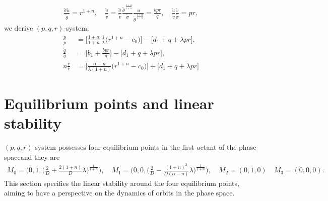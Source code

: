 \documentclass[a4paper,11pt]{article}
\def\tv{{\tilde{v}}}
\def\tth{{\tilde{\theta}}}
\def\ts{{\tilde{\sigma}}}
\def\tu{{\tilde{u}}}
\def\dpp{\dot{p}}
\def\dqq{\dot{q}}
\def\drr{\dot{r}}
\begin{document}
\begin{align*}
 \frac{\ts\tu}{\tth} = r^{1+n}, \quad \frac{\tu}{\tv} = \frac{\ts}{\tv} \frac{\tth^{\,\frac{1+\alpha}{1+n}}}{\ts} \frac{u}{\tth^{\,\frac{1+\alpha}{1+n}}} = \frac{bpr}{q}, \quad \frac{\tu}{\tv} \frac{\tv}{\ts} = pr,
\end{align*}
we derive $(p,q,r)$-system:
\begin{equation} \label{eq:pqrsys}
\begin{aligned}
 \frac{\dpp}{p}&=\Big[\frac{1+\alpha}{1+n}\,\frac{1}{\lambda }\Big(r^{1+n}-c_0\Big)\Big] -\Big[d_1 + q + \lambda pr\Big],\\
 \frac{\dqq}{q}&=\Big[b_1 +\frac{bpr}{q}\Big] -\Big[d_1 + q + \lambda pr\Big],\\
 n\frac{\drr}{r}&=\Big[\frac{\alpha-n}{\lambda(1+n)}\Big(r^{1+n}-c_0\Big)\Big]+\Big[d_1 + q + \lambda pr\Big]
\end{aligned}
\end{equation}
\section{Equilibrium points and linear stability}
$(p,q,r)$-system possesses four equilibrium points in the first octant of the phase space\footnotemark[1] and they are
\begin{align*}
 M_0=\Big(0,1,\big(\frac{2}{D} + \frac{2(1+n)}{D} \lambda\big)^{\frac{1}{1+n}}\Big), \quad M_1=\Big(0,0,\big(\frac{2}{D} -\frac{(1+n)^2}{D(\alpha-n)} \lambda\big)^{\frac{1}{1+n}}\Big), \quad  M_2=(0,1,0) \quad M_3 = (0,0,0).
\end{align*}
This section specifies the linear stability around the four equilibrium points, aiming to have a perspective on the dynamics of orbits in the phase space.
\end{document}
